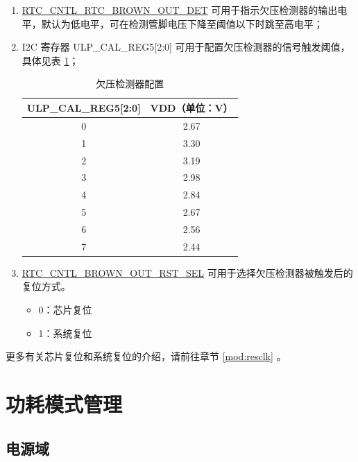 \documentclass[main\_\_CN.tex]{subfiles}
\begin{document}
\begin{enumerate}
\item \hyperref[fielddesc:RTCCNTLRTCBROWNOUTDET]{RTC\_CNTL\_RTC\_BROWN\_OUT\_DET} 可用于指示欠压检测器的输出电平，默认为低电平，可在检测管脚电压下降至阈值以下时跳至高电平；
\item I2C 寄存器 ULP\_CAL\_REG5[2:0] 可用于配置欠压检测器的信号触发阈值，具体见表 \ref{table:brownout-voltage}；

\begin{table}[H]
\caption{欠压检测器配置}\label{table:brownout-voltage}
\centering
\begin{tabular}{|c|c|}
\hline
\rowcolor[HTML]{C0C0C0}
ULP\_CAL\_REG5{[}2:0{]} & VDD（单位：V） \\ \hline
0 & 2.67 \\ \hline
1 & 3.30 \\ \hline
2 & 3.19 \\ \hline
3 & 2.98 \\ \hline
4 & 2.84 \\ \hline
5 & 2.67 \\ \hline
6 & 2.56 \\ \hline
7 & 2.44 \\ \hline
\end{tabular}
\end{table}
\item \hyperref[fielddesc:RTCCNTLBROWNOUTRSTSEL]{RTC\_CNTL\_BROWN\_OUT\_RST\_SEL} 可用于选择欠压检测器被触发后的复位方式。
\begin{itemize}
\item 0：芯片复位
\item 1：系统复位
\end{itemize}
\end{enumerate}

\begin{tiplisting}
更多有关芯片复位和系统复位的介绍，请前往章节 \ref{mod:resclk} \textit{}。
\end{tiplisting}

\section{功耗模式管理}

\subsection{电源域}\label{powerdomain}
\end{document}
